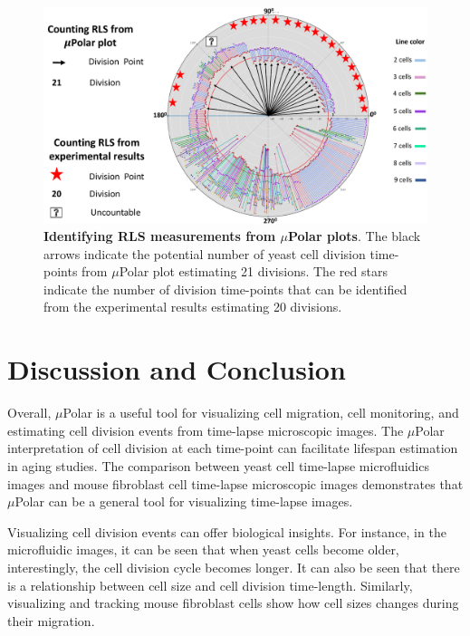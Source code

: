 \documentclass[conference]{IEEEtran}
\begin{document}
\begin{figure}
\centering
\includegraphics[width=\textwidth,height=10 cm]{Patterns/rlsTp1.pdf}
\caption{ \textbf{Identifying RLS measurements from $\mu$Polar plots}. The black arrows indicate the potential number of yeast cell division time-points from $\mu$Polar plot estimating 21 divisions. The red stars indicate the number of division time-points that can be identified from the experimental results  estimating  20 divisions.
}
\label{fig:rls}
\end{figure}

\section{Discussion and Conclusion}

Overall, $\mu$Polar is a useful tool for visualizing cell migration, cell monitoring, and estimating cell division events from time-lapse microscopic images. The $\mu$Polar interpretation of cell division at each time-point can facilitate lifespan estimation in aging studies. The comparison between yeast cell time-lapse microfluidics images and mouse fibroblast cell time-lapse microscopic images demonstrates that $\mu$Polar can be a general tool for visualizing time-lapse images.

Visualizing cell division events can offer biological insights. 
For instance, in the microfluidic images, it can be seen that when yeast cells become older, interestingly, the cell division cycle becomes longer. It can also be seen that there is a relationship between cell size and cell division time-length. Similarly, visualizing and tracking mouse fibroblast cells show how cell sizes changes during their migration. 
\end{document}
